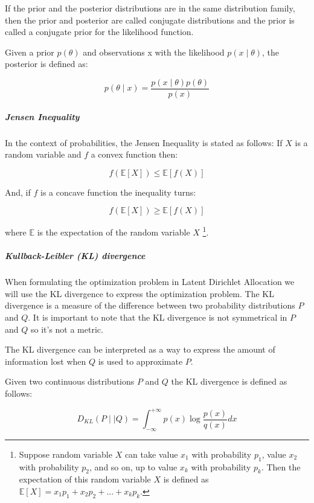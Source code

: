 \documentclass[12pt]{report}
\begin{document}
If the prior and the posterior distributions are in the same distribution
family, then the prior and posterior are called conjugate distributions and the
prior is called a conjugate prior for the likelihood function.

Given a prior $p(\theta)$ and observations x with the likelihood 
$p(x \mid \theta)$, the posterior is defined as:

\begin{equation}
p(\theta \mid x) = \frac{p(x \mid \theta) p(\theta)}{p(x)}
\end{equation}


\subparagraph{Jensen Inequality}

In the context of probabilities, the Jensen Inequality is stated as
follows: If $X$ is a random variable and $f$ a
convex function then:

\begin{equation}
f(\mathbb{E}[X]) \leq \mathbb{E}[f(X)]
\end{equation}

And, if $f$ is a concave function the inequality turns:

\begin{equation}
f(\mathbb{E}[X]) \geq \mathbb{E}[f(X)]
\end{equation}

where $\mathbb{E}$ is the expectation of the random variable $X$
\footnote{Suppose random variable $X$ can take value $x_{1}$ with 
probability $p_{1}$, value $x_{2}$ with probability $p_{2}$, 
and so on, up to value $x_{k}$ with probability $p_{k}$. 
Then the expectation of this random variable $X$ is defined as
$\mathbb{E}[X] = x_{1}p_{1} + x_{2}p_{2} + ... + x_{k}p_{k}$.}.

\subparagraph{Kullback-Leibler (KL) divergence}

When formulating the optimization problem in Latent Dirichlet
Allocation we will use the KL divergence to express the optimization
problem. The KL divergence is a measure of the difference between two
probability distributions $P$ and $Q$. It is important to note that
the KL divergence is not symmetrical in $P$ and $Q$ so it's not a
metric.

The KL divergence can be interpreted as a way to express the amount of 
information lost when $Q$ is used to approximate $P$.

Given two continuous distributions $P$ and $Q$ the KL divergence is
defined as follows:

\begin{equation}
D_{KL}(P \mid \mid Q) = \int_{-\infty}^{+\infty} p(x) \log\frac{p(x)}{q(x)}dx
\end{equation}
\end{document}
